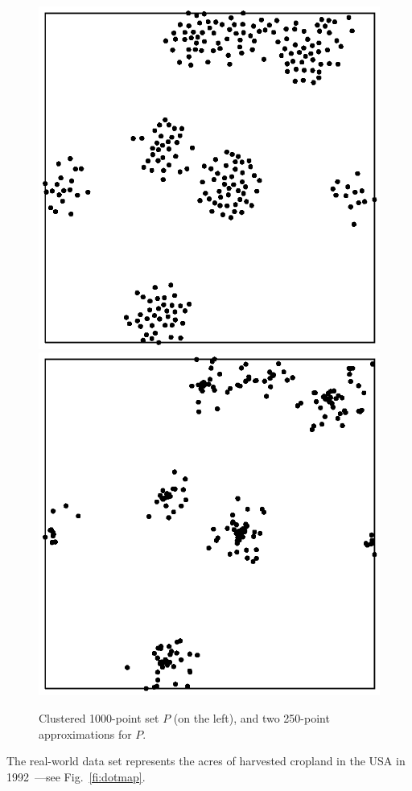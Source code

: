 \documentclass{elsart}
\begin{document}
\begin{figure}[htb]
\begin{center}
{      \vbox{\hbox{\includegraphics[scale=0.5]{dt250}}%
        \hbox{\includegraphics[scale=0.5]{cs250}}}}
  \end{center}
  \caption{Clustered 1000-point set $P$ (on the left), and two
    250-point approximations for $P$.}
  \label{fi:example_result}
\end{figure}
The real-world data
set represents the acres of harvested cropland in the USA in
1992~\cite{realworld}---see Fig.~\ref{fi:dotmap}.
\end{document}
